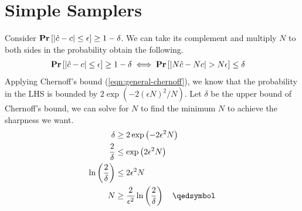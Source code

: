\chapter{Simple Samplers}

Consider $\mathbf{Pr}\left[|\hat{c} - c| \leq \epsilon\right] \geq 1 - \delta$. We can take its complement and multiply $N$ to both sides in the probability obtain the following.
\begin{equation*}
\begin{aligned}
	\mathbf{Pr}\left[|\hat{c} - c| \leq \epsilon\right] \geq 1 - \delta &\iff \mathbf{Pr}\left[|N\hat{c} - Nc| > N\epsilon\right] \leq \delta
\end{aligned}
\end{equation*}
Applying Chernoff's bound (\ref{eqn:general-chernoff}), we know that the probability in the LHS is bounded by $2\exp(-2(\epsilon N)^2 / N)$. Let $\delta$ be the upper bound of Chernoff's bound, we can solve for $N$ to find the minimum $N$ to achieve the sharpness we want.
\begin{equation*}
\begin{aligned}
	\delta &\geq 2\exp\left(-2\epsilon^2N\right) \\
	\frac{2}{\delta} &\leq \exp\left(2\epsilon^2N\right) \\
	\ln\left(\frac{2}{\delta}\right) &\leq 2\epsilon^2N \\
	N &\geq \frac{2}{\epsilon^2}\ln\left(\frac{2}{\delta}\right) \quad \qedsymbol
\end{aligned}
\end{equation*}
